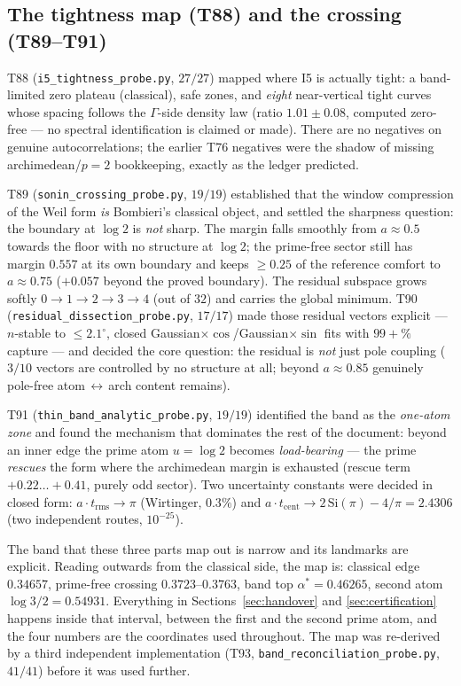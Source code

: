 \documentclass[11pt,a4paper]{article}
\begin{document}
\subsection{The tightness map (T88) and the crossing (T89--T91)}
T88 (\texttt{i5\_tightness\_probe.py}, $27/27$) mapped where I5 is actually tight: a band-limited zero
plateau (classical), safe zones, and \emph{eight} near-vertical tight curves whose spacing follows the
$\Gamma$-side density law (ratio $1.01\pm0.08$, computed zero-free --- no spectral identification is
claimed or made). There are no negatives on genuine autocorrelations; the earlier T76 negatives were
the shadow of missing archimedean/$p=2$ bookkeeping, exactly as the ledger predicted.

T89 (\texttt{sonin\_crossing\_probe.py}, $19/19$) established that the window compression of the Weil
form \emph{is} Bombieri's classical object, and settled the sharpness question: the boundary
at $\log2$ is \emph{not} sharp. The margin falls smoothly from $a\approx0.5$ towards the floor with no
structure at $\log2$; the prime-free sector still has margin $0.557$ at its own boundary and keeps
$\ge0.25$ of the reference comfort to $a\approx0.75$ ($+0.057$ beyond the proved boundary). The
residual subspace grows softly $0\to1\to2\to3\to4$ (out of $32$) and carries the global minimum.
T90 (\texttt{residual\_dissection\_probe.py}, $17/17$) made those residual vectors explicit --- $n$-stable
to $\le2.1^\circ$, closed Gaussian$\times\cos$/Gaussian$\times\sin$ fits with $99{+}\%$ capture --- and
decided the core question: the residual is \emph{not} just pole coupling ($3/10$ vectors are controlled
by no structure at all; beyond $a\approx0.85$ genuinely pole-free atom\,$\leftrightarrow$\,arch content
remains).

T91 (\texttt{thin\_band\_analytic\_probe.py}, $19/19$) identified the band as the \emph{one-atom zone}
and found the mechanism that dominates the rest of the document: beyond an inner edge the prime atom
$u=\log2$ becomes \emph{load-bearing} --- the prime \emph{rescues} the form where the archimedean margin
is exhausted (rescue term $+0.22\ldots+0.41$, purely odd sector). Two uncertainty constants were
decided in closed form: $a\cdot t_{\mathrm{rms}}\to\pi$ (Wirtinger, $0.3\%$) and
$a\cdot t_{\mathrm{cent}}\to2\,\mathrm{Si}(\pi)-4/\pi=2.4306$ (two independent routes, $10^{-25}$).

The band that these three parts map out is narrow and its landmarks are explicit. Reading outwards from
the classical side, the map is: classical edge $0.34657$, prime-free crossing $0.3723$--$0.3763$, band
top $\alpha^*=0.46265$, second atom $\log3/2=0.54931$. Everything in Sections~\ref{sec:handover} and
\ref{sec:certification} happens inside that interval, between the first and the second prime atom, and
the four numbers are the coordinates used throughout. The map was re-derived by a third independent
implementation (T93, \texttt{band\_reconciliation\_probe.py}, $41/41$) before it was used further.
\end{document}
